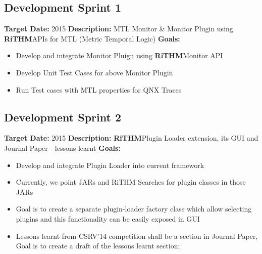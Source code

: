 \documentclass[]{article}
\newcommand{\rithm}{\textbf{RiTHM}\space}
\begin{document}
\subsection{Development Sprint 1}
\textbf{Target Date:}\space {} {2015}\newline
\textbf{Description:} MTL Monitor \& Monitor Plugin using \rithm APIs for MTL (Metric Temporal Logic)\newline
\textbf{Goals:}
\begin{itemize}
\item Develop and integrate Monitor Pluign using \rithm Monitor API
\item Develop Unit Test Cases for above Monitor Plugin
\item Run Test cases with MTL properties for QNX Traces\\
\end{itemize}

\subsection{Development Sprint 2}
\textbf{Target Date:}\space {} {2015}\newline
\textbf{Description:} \rithm Plugin Loader extension,  its GUI and Journal Paper - lessons learnt\newline
\textbf{Goals:}
\begin{itemize}
\item
Develop and integrate Plugin Loader into current framework
\item
Currently, we point JARs and RiTHM Searches for plugin classes in those JARs
\item
Goal is to create a separate plugin-loader factory class which allow selecting plugins and this functionality can be
easily exposed in GUI
\item
Lessons learnt from CSRV'14 competition shall be a section in Journal Paper, Goal is to create a draft of the lessons learnt section; 

\end{itemize}
\end{document}
